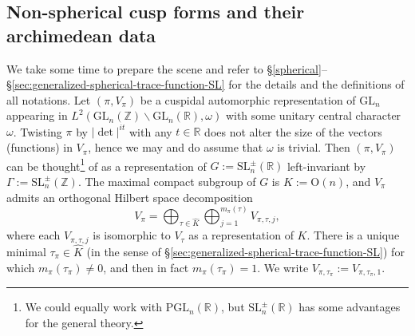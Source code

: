 \documentclass[11pt,oneside]{amsart}
\numberwithin{equation}{section}
\theoremstyle{remark}
\theoremstyle{plain}
\newcommand\GL{\mathrm{GL}}
\newcommand\SL{\mathrm{SL}}
\newcommand\PGL{\mathrm{PGL}}
\newcommand\OO{\mathrm{O}}
\newcommand\ZZ{\mathbb{Z}}
\newcommand\RR{\mathbb{R}}
\newcommand\bs{\backslash}
\begin{document}
\subsection{Non-spherical cusp forms and their archimedean data}
We take some time to prepare the scene and refer to \S\ref{spherical}--\S\ref{sec:generalized-spherical-trace-function-SL} for the details and the definitions of all notations. Let $(\pi,V_{\pi})$ be a cuspidal automorphic representation of $\GL_n$ appearing in $L^2(\GL_n(\ZZ) \bs \GL_n(\RR),\omega)$ with some unitary central character $\omega$. Twisting $\pi$ by $|\det|^{it}$ with any $t\in\RR$ does not alter the size of the vectors (functions) in $V_\pi$, hence we may and do assume that $\omega$ is trivial. Then $(\pi,V_{\pi})$ can be thought\footnote{We could equally work with $\PGL_n(\RR)$, but $\SL_n^{\pm}(\RR)$ has some advantages for the general theory.} of as a representation of $G:=\SL_n^{\pm}(\RR)$ left-invariant by $\Gamma := \SL_n^{\pm}(\ZZ)$. The maximal compact subgroup of $G$ is $K:=\OO(n)$, and $V_{\pi}$ admits an orthogonal Hilbert space decomposition
\[
V_{\pi}=\bigoplus_{\tau\in\widehat{K}} \bigoplus_{j=1}^{m_{\pi}(\tau)} V_{\pi,\tau,j},
\]
where each $V_{\pi,\tau,j}$ is isomorphic to $V_{\tau}$ as a representation of $K$. There is a unique minimal $\tau_{\pi}\in\widehat{K}$ (in the sense of \S\ref{sec:generalized-spherical-trace-function-SL}) for which $m_{\pi}(\tau_{\pi})\neq 0$, and then in fact $m_{\pi}(\tau_{\pi})=1$. We write $V_{\pi,\tau_{\pi}}:=V_{\pi,\tau_{\pi},1}$.
\end{document}
